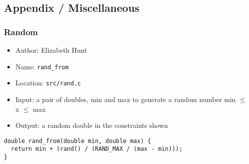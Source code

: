 \documentclass[11pt]{article}
\begin{document}
\subsection{Appendix / Miscellaneous}
\label{sec:orga72494e}
\subsubsection{Random}
\label{sec:org4940c39}
\begin{itemize}
\item Author: Elizabeth Hunt
\item Name: \texttt{rand\_from}
\item Location: \texttt{src/rand.c}
\item Input: a pair of doubles, min and max to generate a random number min
\(\le\) x \(\le\) max
\item Output: a random double in the constraints shown
\end{itemize}

\begin{verbatim}
double rand_from(double min, double max) {
  return min + (rand() / (RAND_MAX / (max - min)));
}
\end{verbatim}
\end{document}
